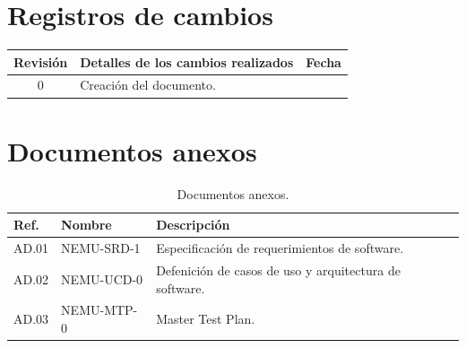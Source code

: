 \documentclass[
  11pt, %
  codirector, %
]{charter}
\begin{document}
\maketitle
\tableofcontents

\newpage

\section*{Registros de cambios}
\label{sec:registro}


\begin{table}[ht]
	\label{tab:registro}
	\centering
	\begin{tabularx}{\linewidth}{@{}|c|X|c|@{}}
		\hline
		\rowcolor[HTML]{C0C0C0}
		Revisión & \multicolumn{1}{c|}{\cellcolor[HTML]{C0C0C0}Detalles de los cambios realizados} & Fecha      \\ \hline
		0      & Creación del documento.                                 &\fechaInicioName \\ \hline



    \hline

	\end{tabularx}
	\label{sec:cierre}
\end{table}



\section*{Documentos anexos}
\label{sec:documentos_anexos}

\begin{table}[h!]
	\centering
	\begin{tabular}{ | m{1.5cm} | m{3cm} | m{10.5cm} | }
		\hline
		\rowcolor{gray!50} %
		\textbf{Ref.} & \textbf{Nombre} & \textbf{Descripción} \\ \hline
    AD.01 & NEMU-SRD-1 & Especificación de requerimientos de software. \\ \hline
		AD.02 & NEMU-UCD-0 & Defenición de casos de uso y arquitectura de software. \\ \hline
		AD.03 & NEMU-MTP-0 & Master Test Plan.\\ \hline

	\end{tabular}
  \caption{Documentos anexos.}
  \label{tab:referencias}

\end{table}
\end{document}
